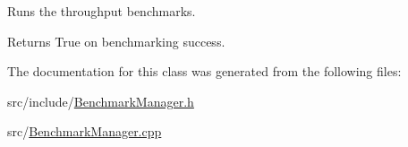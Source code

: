 Runs the throughput benchmarks. 

\begin{DoxyReturn}{Returns}
True on benchmarking success. 
\end{DoxyReturn}


The documentation for this class was generated from the following files\-:\begin{DoxyCompactItemize}
\item 
src/include/\hyperlink{_benchmark_manager_8h}{Benchmark\-Manager.\-h}\item 
src/\hyperlink{_benchmark_manager_8cpp}{Benchmark\-Manager.\-cpp}\end{DoxyCompactItemize}
